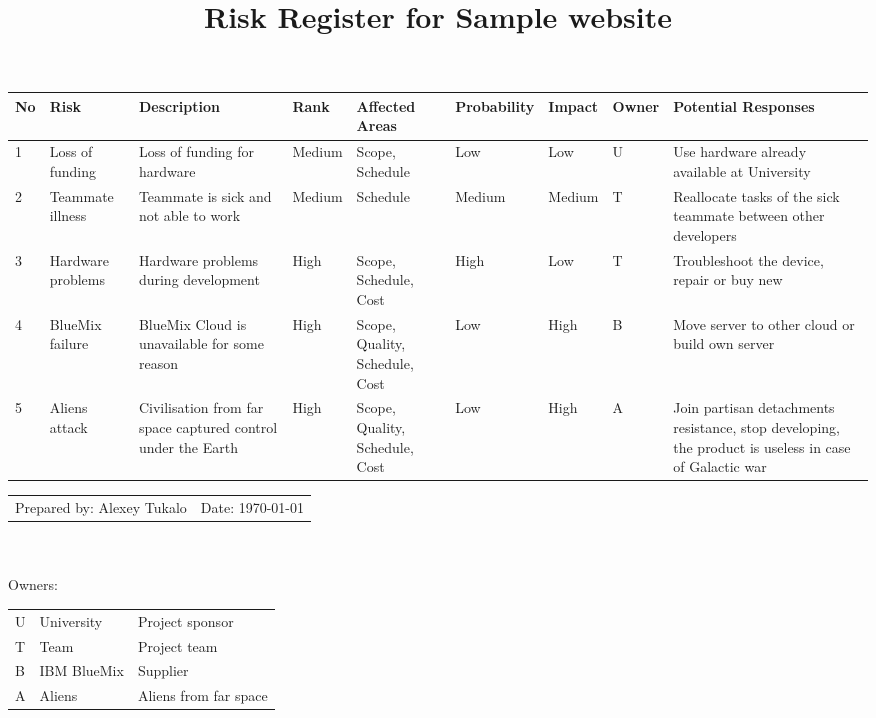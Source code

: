 \documentclass[english]{article}
\title{Risk Register for Sample website}
\date{}
\begin{document}
\maketitle



\begin{tabular}{|p{0.5cm}|p{2.5cm}|p{4cm}|p{1.5cm}|p{1.5cm}|p{1.5cm}|p{1.5cm}|p{1.5cm}|p{6cm}|}
  \hline  
No & Risk & Description & Rank & Affected Areas & Probability & Impact & Owner & Potential Responses \\
  \hline  
1 &
Loss of funding &
Loss of funding for hardware & 
Medium & 
Scope, Schedule & 
Low & 
Low & 
U & 
Use hardware already available at University \\
  \hline  
  2 &
Teammate illness &
Teammate is sick and not able to work  & 
Medium & 
Schedule & 
Medium & 
Medium & 
T & 
Reallocate tasks of the sick teammate between other developers \\
  \hline  
    3 &
Hardware problems &
Hardware problems during development & 
High & 
Scope, Schedule, Cost & 
High & 
Low & 
T & 
Troubleshoot the device, repair or buy new\\
  \hline  
      4 &
BlueMix failure &
BlueMix Cloud is unavailable for some reason  & 
High & 
Scope, Quality, Schedule, Cost & 
Low & 
High & 
B & 
Move server to other cloud or build own server\\
  \hline 
 5 &
Aliens attack &
Civilisation from far space captured control under the Earth & 
High & 
Scope, Quality, Schedule, Cost & 
Low & 
High & 
A & 
Join partisan detachments resistance, stop developing, the product is useless in case of Galactic war \\
  \hline 
  
\end{tabular}

\begin{tabular}{ l l}
\\
Prepared by: Alexey Tukalo & Date: \today \\

\end{tabular}\\\\
Owners:\\
\begin{tabular}{l l l}
U & University & Project sponsor\\
T & Team & Project team\\
B & IBM BlueMix & Supplier\\
A & Aliens & Aliens from far space\\
\end{tabular}
\end{document}
